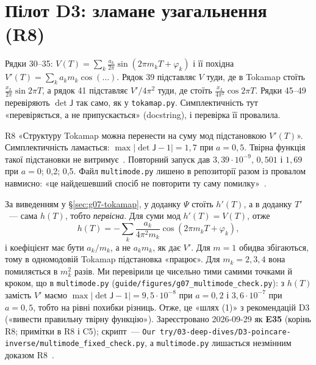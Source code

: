 \section{Пілот D3: зламане узагальнення (R8)}\label{sec:g07-r8}


Рядки 30--35: $V(T)=\sum_k\frac{a_k}{2\pi}\sin(2\pi m_kT+\varphi_k)$ і її похідна $V'(T)=\sum_ka_km_k\cos(\dots)$. Рядок 39 підставляє $V$ туди, де в Tokamap стоїть $\frac{x_L}{2\pi}\sin2\pi T$, а рядок 41 підставляє $V'/4\pi^2$ туди, де стоїть $\frac{x_L}{4\pi^2}\cos2\pi T$. Рядки 45--49 перевіряють $\det\mathsf J$ так само, як у \texttt{tokamap.py}. Симплектичність тут «перевіряється, а не припускається» (docstring), і перевірка її провалила.

\begin{refuted}{R8}
«Структуру Tokamap можна перенести на суму мод підстановкою $V'(T)$». Симплектичність ламається: $\max|\det\mathsf J-1|=1{,}7$ при $a=0{,}5$. Твірна функція такої підстановки не витримує~\cite{RegEst}. Повторний запуск дав $3{,}39\cdot10^{-9}$, $0{,}501$ і $1{,}69$ при $a=0$; 0,2; 0,5. Файл \texttt{multimode.py} лишено в репозиторії разом із провалом навмисно: «це найдешевший спосіб не повторити ту саму помилку»~\cite{g07D3}.
\end{refuted}

\begin{derivation}
За виведенням у \S\ref{sec:g07-tokamap}, у доданку $\Psi$ стоїть $h'(T)$, а в доданку $T'$~--- сама $h(T)$, тобто \emph{первісна}. Для суми мод $h'(T)=V(T)$, отже
\[
  h(T)=-\sum_k\frac{a_k}{4\pi^2m_k}\cos(2\pi m_kT+\varphi_k),
\]
і коефіцієнт має бути $a_k/m_k$, а не $a_km_k$, як дає $V'$. Для $m=1$ обидва збігаються, тому в одномодовій Tokamap підстановка «працює». Для $m_k=2,3,4$ вона помиляється в $m_k^2$ разів. Ми перевірили це чисельно тими самими точками й кроком, що в \texttt{multimode.py} (\texttt{guide/figures/g07\_multimode\_check.py}): з $h(T)$ замість $V'$ маємо $\max|\det\mathsf J-1|=9{,}5\cdot10^{-8}$ при $a=0{,}2$ і $3{,}6\cdot10^{-7}$ при $a=0{,}5$, тобто на рівні похибки різниць. Отже, це «шлях (1)» з рекомендацій D3 («вивести правильну твірну функцію»). Зареєстровано 2026-09-29 як \textbf{E35} (корінь R8; примітки в R8 і C5); скрипт~--- \texttt{Our try/03-deep-dives/D3-poincare-inverse/multimode\_fixed\_check.py}, а \texttt{multimode.py} лишається незмінним доказом R8~\cite{RegEst,RegLog}.
\end{derivation}

